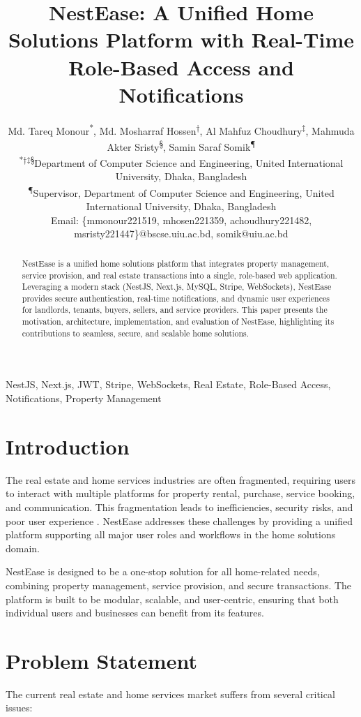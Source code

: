 \documentclass[conference]{IEEEtran}
\title{NestEase: A Unified Home Solutions Platform with Real-Time Role-Based Access and Notifications}
\author{
Md. Tareq Monour\textsuperscript{*}, Md. Mosharraf Hossen\textsuperscript{†}, Al Mahfuz Choudhury\textsuperscript{‡}, Mahmuda Akter Sristy\textsuperscript{§}, Samin Saraf Somik\textsuperscript{¶} \\
\textsuperscript{*†‡§}Department of Computer Science and Engineering, United International University, Dhaka, Bangladesh \\
\textsuperscript{¶}Supervisor, Department of Computer Science and Engineering, United International University, Dhaka, Bangladesh \\
Email: \{mmonour221519, mhosen221359, achoudhury221482, msristy221447\}@bscse.uiu.ac.bd, somik@uiu.ac.bd
}
\begin{document}
\maketitle

\begin{abstract}
NestEase is a unified home solutions platform that integrates property management, service provision, and real estate transactions into a single, role-based web application. Leveraging a modern stack (NestJS, Next.js, MySQL, Stripe, WebSockets), NestEase provides secure authentication, real-time notifications, and dynamic user experiences for landlords, tenants, buyers, sellers, and service providers. This paper presents the motivation, architecture, implementation, and evaluation of NestEase, highlighting its contributions to seamless, secure, and scalable home solutions.
\end{abstract}

\begin{IEEEkeywords}
NestJS, Next.js, JWT, Stripe, WebSockets, Real Estate, Role-Based Access, Notifications, Property Management
\end{IEEEkeywords}

\section{Introduction}
The real estate and home services industries are often fragmented, requiring users to interact with multiple platforms for property rental, purchase, service booking, and communication. This fragmentation leads to inefficiencies, security risks, and poor user experience \cite{real_estate_platforms}. NestEase addresses these challenges by providing a unified platform supporting all major user roles and workflows in the home solutions domain.

NestEase is designed to be a one-stop solution for all home-related needs, combining property management, service provision, and secure transactions. The platform is built to be modular, scalable, and user-centric, ensuring that both individual users and businesses can benefit from its features.

\section{Problem Statement}
The current real estate and home services market suffers from several critical issues:
\end{document}
